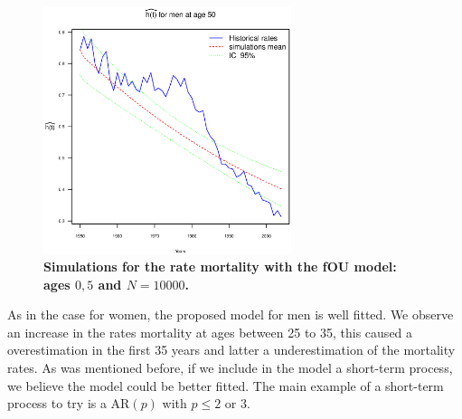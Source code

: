 \documentclass[smallextended]{svjour3}
\begin{document}
\begin{figure}[H]
    \includegraphics[width = 2.85in]{PlotMen50.eps}
    \caption{\bf Simulations for the rate mortality with the fOU model: ages
    $0,5$ and $N=10000$.}
    \label{graph-simu_FOU3}
\end{figure}\vspace*{0.1cm}

As in the case for women, the proposed model for men is well fitted.
We observe an increase in the rates mortality at ages between 25 to 35, this
caused a overestimation in the first 35 years and latter a underestimation
of the mortality rates. As was mentioned before, if we include in the model a
short-term process,  we believe the model could be better fitted. The main
example  of a short-term process to try is a AR$(p)$ with $p\le 2$ or $3$.
\end{document}
